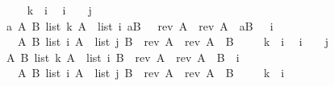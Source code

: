 \documentclass[twoside,runningheads,envcountsame,envcountsect,oribibl,orivec]{llncs}
\begin{document}
\begin{figure}
\begin{isabellebody}
\isanewline\ \ \ {\isasymsqsubseteq}\hfill \isanewline
{\isacharbackquote}k\ {\isacharcolon}{\isacharequal}\ {\isacharat}{\isacharparenleft}{\isacharbackquote}i\ {\isacharplus}\ {}{\isacharparenright}{\isacharsemicolon}\isanewline
{\isacharat}{\isacharparenleft}{\isacharbackquote}i\ {\isacharplus}\ {}{\isacharparenright}\ {\isacharcolon}{\isacharequal}\ {\isacharbackquote}j{\isacharsemicolon}\isanewline
{\isasymlbrakk}{\isacharparenleft}a\ A\ B{\isachardot}\ {\isacharparenleft}list\ {\isacharbackquote}k\ A\ {\isacharasterisk}\ list\ {\isacharbackquote}i\ {\isacharparenleft}a{\isacharhash}B{\isacharparenright}\ {\isacharparenright}\ \ {\isacharparenleft}rev\ A{\isacharparenright}\ {\isacharequal}\ {\isacharparenleft}rev\ A{\isacharparenright}\ {\isacharat}\ {\isacharparenleft}a{\isacharhash}B{\isacharparenright}\ {\isacharparenright}\ \ {\isacharbackquote}i\ {\isasymnoteq}\ {}{\isacharcomma}\ \isanewline
\ \ A\ B{\isachardot}\ {\isacharparenleft}list\ {\isacharbackquote}i\ A\ {\isacharasterisk}\ list\ {\isacharbackquote}j\ B{\isacharparenright}\ \ {\isacharparenleft}rev\ A{\isacharparenright}\ {\isacharequal}\ {\isacharparenleft}rev\ A{\isacharparenright}\ {\isacharat}\ B\ {\isasymrbrakk}
\isanewline\ \ \ {\isasymsqsubseteq}\hfill \isanewline
{\isacharbackquote}k\ {\isacharcolon}{\isacharequal}\ {\isacharat}{\isacharparenleft}{\isacharbackquote}i\ {\isacharplus}\ {}{\isacharparenright}{\isacharsemicolon}\isanewline
{\isacharat}{\isacharparenleft}{\isacharbackquote}i\ {\isacharplus}\ {}{\isacharparenright}\ {\isacharcolon}{\isacharequal}\ {\isacharbackquote}j{\isacharsemicolon}\isanewline
{\isasymlbrakk}{\isacharparenleft}A\ B{\isachardot}\ {\isacharparenleft}list\ {\isacharbackquote}k\ A\ {\isacharasterisk}\ list\ {\isacharbackquote}i\ B{\isacharparenright}\ \ {\isacharparenleft}rev\ A{\isacharparenright}\ {\isacharequal}\ {\isacharparenleft}rev\ A{\isacharparenright}\ {\isacharat}\ B{\isacharparenright}\ \ {\isacharbackquote}i\ {\isasymnoteq}\ {}{\isacharcomma}\ \isanewline
\ \ A\ B{\isachardot}\ {\isacharparenleft}list\ {\isacharbackquote}i\ A\ {\isacharasterisk}\ list\ {\isacharbackquote}j\ B{\isacharparenright}\ \ {\isacharparenleft}rev\ A{\isacharparenright}\ {\isacharequal}\ {\isacharparenleft}rev\ A{\isacharparenright}\ {\isacharat}\ B\ {\isasymrbrakk}
\isanewline\ \ \ {\isasymsqsubseteq}\hfill \isanewline
{\isacharbackquote}k\ {\isacharcolon}{\isacharequal}\ {\isacharat}{\isacharparenleft}{\isacharbackquote}i\ {\isacharplus}\ {}{\isacharparenright}{\isacharsemicolon}\isanewline

\end{isabellebody}
\end{figure}
\end{document}
